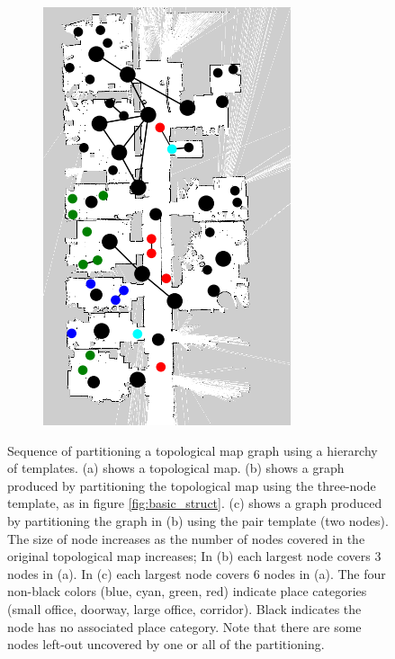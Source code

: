 \documentclass[10pt, titlepage]{article}
\theoremstyle{definition}
\begin{document}
\begin{figure}[!htb]
\begin{subfigure}{.3\textwidth}
  \includegraphics[width=.8\linewidth]{images/partition_by_hier_topo_map}
  \caption{}
  \label{fig:part_hier}
\end{subfigure}
\captionsetup{width=.8\linewidth}
\caption{ Sequence of partitioning a topological map graph using a hierarchy of templates. (a) shows a topological map. (b) shows a graph produced by partitioning the topological map using the three-node template, as in figure \ref{fig:basic_struct}. (c) shows a graph produced by partitioning the graph in (b) using the pair template (two nodes). The size of node increases as the number of nodes covered in the original topological map increases; In (b) each largest node covers 3 nodes in (a). In (c) each largest node covers 6 nodes in (a). The four non-black colors (blue, cyan, green, red) indicate place categories (small office, doorway, large office, corridor). Black indicates the node has no associated place category. Note that there are some nodes left-out uncovered by one or all of the partitioning.}
\end{figure}
\end{document}

